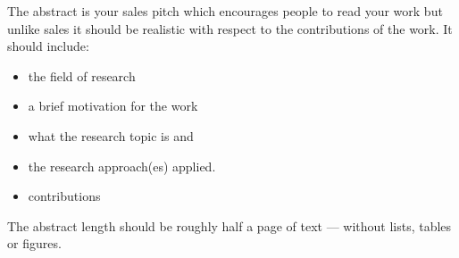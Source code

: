 The abstract is your sales pitch which encourages people to read your work but unlike sales it should be realistic with respect to the contributions of the work. It should include:
\begin{itemize}
\item the field of research
\item a brief motivation for the work
\item what the research topic is and
\item the research approach(es) applied. 
\item contributions
\end{itemize}

The abstract length should be roughly half a page of text --- without lists, tables or figures.  

\fi
